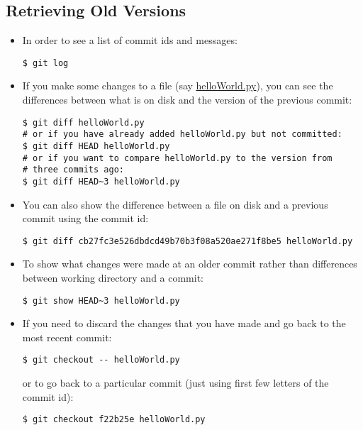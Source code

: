 \subsection{Retrieving Old Versions}
\begin{itemize}
\item In order to see a list of commit ids and messages:
\begin{lstlisting}
$ git log
\end{lstlisting}
\pause 
\item If you make some changes to a file (say \url{helloWorld.py}), you
can see the differences between what is on disk and the version of
the previous commit:
\begin{lstlisting}
$ git diff helloWorld.py
# or if you have already added helloWorld.py but not committed:
$ git diff HEAD helloWorld.py
# or if you want to compare helloWorld.py to the version from 
# three commits ago:
$ git diff HEAD~3 helloWorld.py
\end{lstlisting}
\pause 
\item You can also show the difference between a file on disk and a previous
commit using the commit id:
\begin{lstlisting}
$ git diff cb27fc3e526dbdcd49b70b3f08a520ae271f8be5 helloWorld.py
\end{lstlisting}
\pause 
\item To show what changes were made at an older commit rather than differences
between working directory and a commit:
\begin{lstlisting}
$ git show HEAD~3 helloWorld.py
\end{lstlisting}
\pause 
\item If you need to discard the changes that you have made and go back
to the most recent commit:
\begin{lstlisting}
$ git checkout -- helloWorld.py
\end{lstlisting}
or to go back to a particular commit (just using first few letters
of the commit id):
\begin{lstlisting}
$ git checkout f22b25e helloWorld.py
\end{lstlisting}
\end{itemize}

